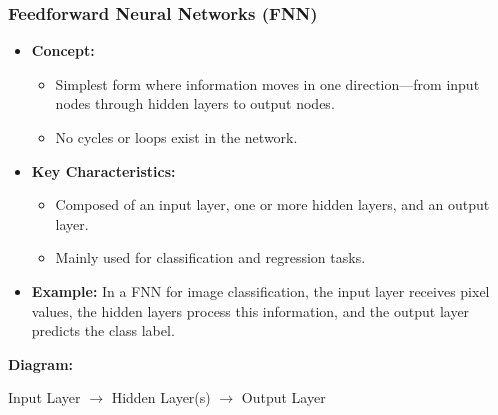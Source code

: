 \documentclass[aspectratio=169]{beamer}
\begin{document}
\begin{frame}[fragile]
  \frametitle{Feedforward Neural Networks (FNN)}
  \begin{itemize}
    \item \textbf{Concept:}
    \begin{itemize}
      \item Simplest form where information moves in one direction—from input nodes through hidden layers to output nodes.
      \item No cycles or loops exist in the network.
    \end{itemize}

    \item \textbf{Key Characteristics:}
    \begin{itemize}
      \item Composed of an input layer, one or more hidden layers, and an output layer.
      \item Mainly used for classification and regression tasks.
    \end{itemize}

    \item \textbf{Example:}
    In a FNN for image classification, the input layer receives pixel values, the hidden layers process this information, and the output layer predicts the class label.
  \end{itemize}

  \vspace{0.5cm}
  \textbf{Diagram:}
  \begin{center}
    Input Layer $\rightarrow$ Hidden Layer(s) $\rightarrow$ Output Layer
  \end{center}
\end{frame}
\end{document}
